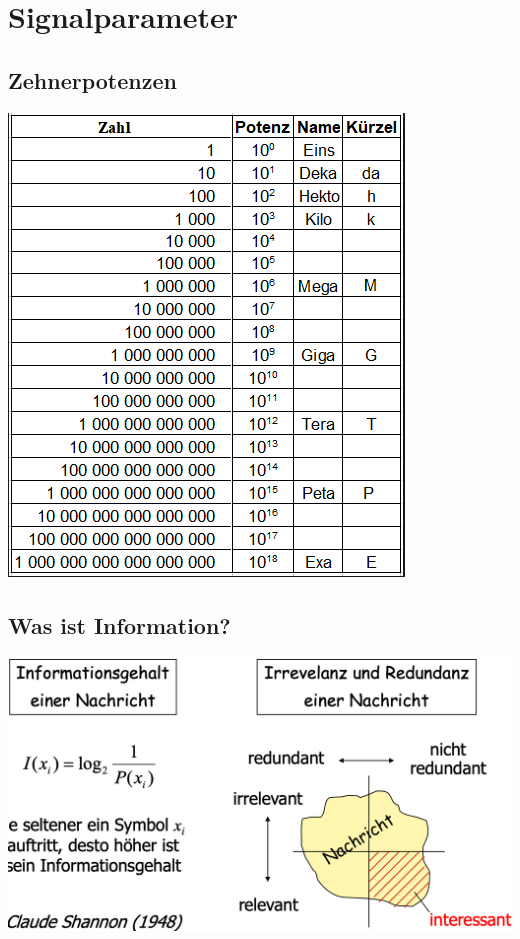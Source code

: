 
\section{Signalparameter}

\subsection{Zehnerpotenzen}
\begin{center}
    \includegraphics[scale=.38]{graphic/signalparameter/zehnerpotenzen.png}
\end{center}
\vspace{-8pt}




\subsection{Was ist Information?}
\begin{center}
    \includegraphics[width=\linewidth]{graphic/signalparameter/wasist.png}
\end{center}
\vspace{-8pt}



